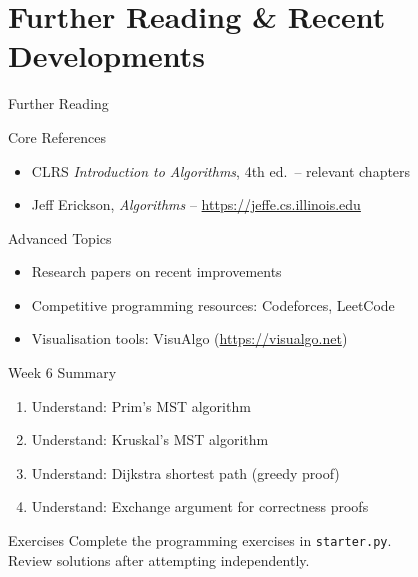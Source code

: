 \documentclass[aspectratio=169,xcolor=dvipsnames]{beamer}
\begin{document}
\section{Further Reading \& Recent Developments}
\begin{frame}{Further Reading}
  \begin{block}{Core References}
    \begin{itemize}
      \item CLRS \textit{Introduction to Algorithms}, 4th ed.\ -- relevant chapters
      \item Jeff Erickson, \textit{Algorithms} -- \url{https://jeffe.cs.illinois.edu}
    \end{itemize}
  \end{block}
  \begin{exampleblock}{Advanced Topics}
    \begin{itemize}
      \item Research papers on recent improvements
      \item Competitive programming resources: Codeforces, LeetCode
      \item Visualisation tools: VisuAlgo (\url{https://visualgo.net})
    \end{itemize}
  \end{exampleblock}
\end{frame}

\begin{frame}{Week 6 Summary}
  \begin{enumerate}
    \item Understand: Prim's MST algorithm
    \item Understand: Kruskal's MST algorithm
    \item Understand: Dijkstra shortest path (greedy proof)
    \item Understand: Exchange argument for correctness proofs
  \end{enumerate}
  \begin{block}{Exercises}
    Complete the programming exercises in \texttt{starter.py}.\\
    Review solutions after attempting independently.
  \end{block}
\end{frame}
\end{document}
